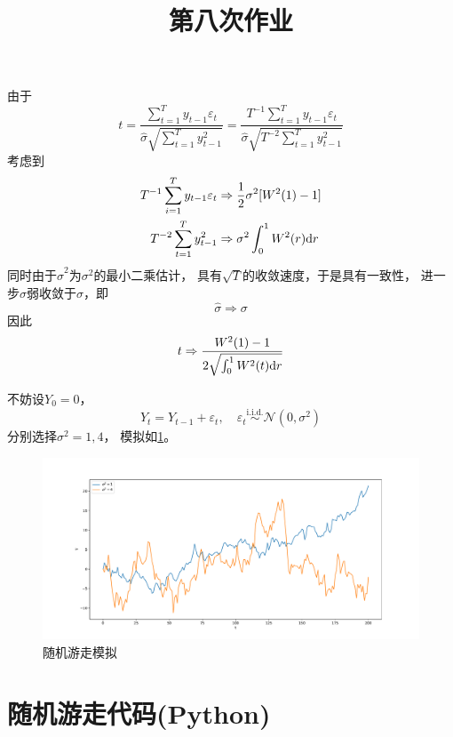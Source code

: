 \documentclass[cn]{homework}
\title{第八次作业}
\begin{document}
    \maketitle

    \problem
    由于
    \[t=\frac{\sum_{t=1}^Ty_{t-1}\varepsilon_t}
    {\hat\sigma\sqrt{\sum_{t=1}^Ty_{t-1}^2}}
    =\frac{T^{-1}\sum_{t=1}^Ty_{t-1}\varepsilon_t}
    {\hat\sigma\sqrt{T^{-2}\sum_{t=1}^Ty_{t-1}^2}}\]
    考虑到
    \[\begin{aligned}
        T^{-1}\sum_{i=1}^Ty_{t-1}\varepsilon_t
        &\Rightarrow\frac{1}{2}\sigma^2 [W^2(1)-1]\\
        T^{-2}\sum_{t=1}^Ty_{t-1}^2
        &\Rightarrow\sigma^2\int_0^1W^2(r)\mathrm d r
    \end{aligned}\]
    同时由于$\hat\sigma^2$为$\sigma^2$的最小二乘估计，
    具有$\sqrt{T}$的收敛速度，于是具有一致性，
    进一步$\hat\sigma$弱收敛于$\sigma$，即
    \[\hat\sigma\Rightarrow\sigma\]
    因此
    \[t\Rightarrow\frac{W^2(1)-1}{2\sqrt{\int_0^1W^2(t)\mathrm d r}}\]

    

    \problem
    不妨设$Y_0=0$，
    \[Y_t=Y_{t-1}+\varepsilon_t,\quad
    \varepsilon_t\overset{\text{i.i.d.}}\sim\mathcal N(0,\sigma^2)\]
    分别选择$\sigma^2=1,4$，
    模拟如\cref{fig:simulation}。
    \begin{figure}[h]
        \centering
        \includegraphics[width=\linewidth]{simulation}
        \caption{随机游走模拟}
        \label{fig:simulation}
    \end{figure}

    \newpage
    \appendix
    \section{随机游走代码(Python)}
    
\end{document}
